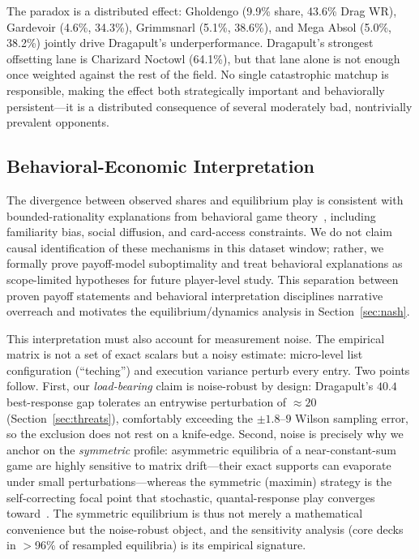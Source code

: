 \documentclass[journal]{IEEEtran}
\newif\ifhighlightchanges
\newcommand{\revised}[1]{\ifhighlightchanges\textcolor{blue!70!black}{#1}\else#1\fi}
\let\origsubsection\subsection
\renewcommand{\subsection}{\needspace{3\baselineskip}\origsubsection}
\begin{document}
The paradox is a distributed effect: Gholdengo (9.9\% share, 43.6\% Drag WR), Gardevoir (4.6\%, 34.3\%), Grimmsnarl (5.1\%, 38.6\%), and Mega Absol (5.0\%, 38.2\%) jointly drive Dragapult's underperformance.
Dragapult's strongest offsetting lane is Charizard Noctowl (64.1\%), but that lane alone is not enough once weighted against the rest of the field.
No single catastrophic matchup is responsible, making the effect both strategically important and behaviorally persistent---it is a distributed consequence of several moderately bad, nontrivially prevalent opponents.

\subsection{Behavioral-Economic Interpretation}

The divergence between observed shares and equilibrium play is consistent with bounded-rationality explanations from behavioral game theory~\cite{Tversky1974,Kahneman1979,Banerjee1992,Bikhchandani1992,mckelvey1995quantal,nagel1995unraveling}, including familiarity bias, social diffusion, and card-access constraints.
We do not claim causal identification of these mechanisms in this dataset window; rather, we formally prove payoff-model suboptimality and treat behavioral explanations as scope-limited hypotheses for future player-level study.
This separation between proven payoff statements and behavioral interpretation disciplines narrative overreach and motivates the equilibrium/dynamics analysis in Section~\ref{sec:nash}.

\revised{This interpretation must also account for measurement noise.
The empirical matrix is not a set of exact scalars but a noisy estimate: micro-level list configuration (``teching'') and execution variance perturb every entry.
Two points follow.
First, our \emph{load-bearing} claim is noise-robust by design: Dragapult's $40.4$\textperthousand{} best-response gap tolerates an entrywise perturbation of ${\approx}20$\textperthousand{} (Section~\ref{sec:threats}), comfortably exceeding the ${\pm}1.8$--$9$\textperthousand{} Wilson sampling error, so the exclusion does not rest on a knife-edge.
Second, noise is precisely why we anchor on the \emph{symmetric} profile: asymmetric equilibria of a near-constant-sum game are highly sensitive to matrix drift---their exact supports can evaporate under small perturbations---whereas the symmetric (maximin) strategy is the self-correcting focal point that stochastic, quantal-response play converges toward~\cite{mckelvey1995quantal}.
The symmetric equilibrium is thus not merely a mathematical convenience but the noise-robust object, and the sensitivity analysis (core decks in $>$96\% of resampled equilibria) is its empirical signature.}
\end{document}

